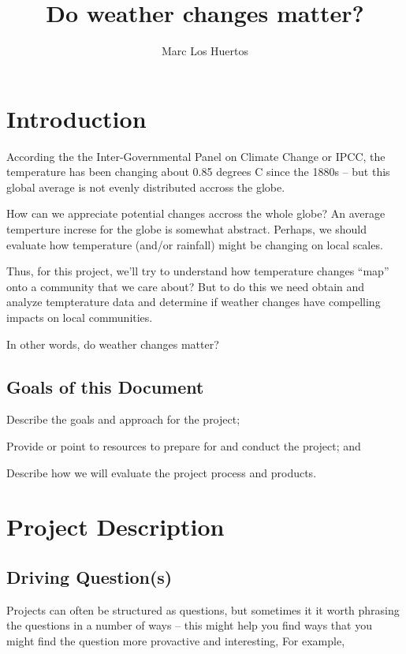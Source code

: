 \documentclass{article}\usepackage[]{graphicx}\usepackage[]{color}
\title{Do weather changes matter?}
\author{Marc Los Huertos}
\newenvironment{enumerate*}%
  {\begin{enumerate}%
    \setlength{\itemsep}{0pt}%
    \setlength{\parskip}{0pt}}%
  {\end{enumerate}}
\begin{document}
\maketitle

\section{Introduction}

According the the Inter-Governmental Panel on Climate Change or IPCC, the temperature has been changing about 0.85 degrees C since the  1880s -- but this global average is not evenly distributed accross the globe. 

How can we appreciate potential changes accross the whole globe? An average temperture increse for the globe is somewhat abstract.   Perhaps, we should evaluate how temperature (and/or rainfall) might be changing on local scales. 

Thus, for this project, we'll try to understand how temperature changes ``map'' onto a community that we care about? But to do this we need obtain and analyze tempterature data and determine if weather changes have compelling impacts on local communities.

In other words, do weather changes matter?

\subsection{Goals of this Document}

\begin{enumerate*}
  \item Describe the goals and approach for the project;
  \item Provide or point to resources to prepare for and conduct the project; and
  \item Describe how we will evaluate the project process and products.
\end{enumerate*}

\section{Project Description}

\subsection{Driving Question(s)}

Projects can often be structured as questions, but sometimes it it worth phrasing the questions in a number of ways -- this might help you find ways that you might find the question more provactive and interesting, For example,
\end{document}

